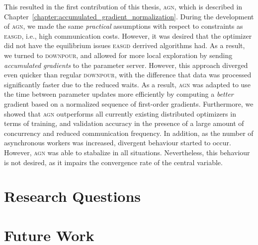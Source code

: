 This resulted in the first contribution of this thesis, \textsc{agn}, which is described in Chapter~\ref{chapter:accumulated_gradient_normalization}. During the development of \textsc{agn}, we made the same \emph{practical} assumptions with respect to constraints as \textsc{easgd}, i.e., high communication costs. However, it was desired that the optimizer did not have the equilibrium issues \textsc{easgd} derrived algorithms had. As a result, we turned to \textsc{downpour}, and allowed for more local exploration by sending \emph{accumulated gradients} to the parameter server. However, this approach diverged even quicker than regular \textsc{downpour}, with the difference that data was processed significantly faster due to the reduced waits. As a result, \textsc{agn} was adapted to use the time between parameter updates more efficiently by computing a \emph{better} gradient based on a normalized sequence of first-order gradients. Furthermore, we showed that \textsc{agn} outperforms all currently existing distributed optimizers in terms of training, and validation accuracy in the presence of a large amount of concurrency and reduced communication frequency. In addition, as the number of asynchronous workers was increased, divergent behaviour started to occur. However, \textsc{agn} was able to stabalize in all situations. Nevertheless, this behaviour is not desired, as it impairs the convergence rate of the central variable.

\section{Research Questions}
\label{sec:conclusion_research_questions}

\section{Future Work}
\label{sec:conclusion_future_work}
